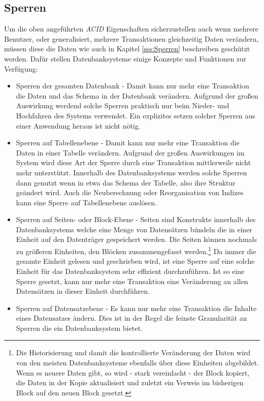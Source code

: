 \subsection{Sperren}
Um die oben angeführten \emph{ACID} Eigenschaften sicherzustellen auch wenn mehrere Benutzer, oder generalisiert, mehrere Transaktionen gleichzeitig Daten verändern, müssen diese die Daten wie auch in Kapitel \ref{sss:Sperren} beschreiben geschützt werden. Dafür stellen Datenbanksysteme einige Konzepte und Funktionen zur Verfügung:
\begin{itemize}
	\item Sperren der gesamten Datenbank - Damit kann nur mehr eine Transaktion die Daten und das Schema in der Datenbank verändern. Aufgrund der großen Auswirkung werdend solche Sperren praktisch nur beim Nieder- und Hochfahren des Systems verwendet. Ein explizites setzen solcher Sperren aus einer Anwendung heraus ist nicht nötig.
	\item Sperren auf Tabellenebene - Damit kann nur mehr eine Transaktion die Daten in einer Tabelle verändern. Aufgrund der großen Auswirkungen im System wird diese Art der Sperre durch eine Transaktion mittlerweile nicht mehr unterstützt. Innerhalb des Datenbanksystems werden solche Sperren dann genutzt wenn in etwa das Schema der Tabelle, also ihre Struktur geändert wird. Auch die Neuberechnung oder Reorganisation von Indizes kann eine Sperre auf Tabellenebene auslösen.\parencite{ms_idx_rebuild}
	\item Sperren auf Seiten- oder Block-Ebene - Seiten sind Konstrukte innerhalb des Datenbanksystems welche eine Menge von Datensätzen bündeln die in einer Einheit auf den Datenträger gespeichert werden. Die Seiten können nochmals zu größeren Einheiten, den Blöcken zusammengefasst werden.\footnote{Die Historisierung und damit die kontrollierte Veränderung der Daten wird von den meisten Datenbanksysteme ebenfalls über diese Einheiten abgebildet. Wenn es neuere Daten gibt, so wird - stark vereinfacht - der Block kopiert, die Daten in der Kopie aktualisiert und zuletzt ein Verweis im bisherigen Block auf den neuen Block gesetzt.}\parencite[S. 30f]{WeikumVossen02} Da immer die gesamte Einheit gelesen und geschrieben wird, ist eine Sperre auf eine solche Einheit für das Datenbanksystem sehr effizient durchzuführen. Ist so eine Sperre gesetzt, kann nur mehr eine Transaktion eine Veränderung an allen Datensätzen in dieser Einheit durchführen.
	\item Sperren auf Datensatzebene - Es kann nur mehr eine Transaktion die Inhalte eines Datensatzes ändern. Dies ist in der Regel die feinste Granularität an Sperren die ein Datenbanksystem bietet.

\end{itemize}
